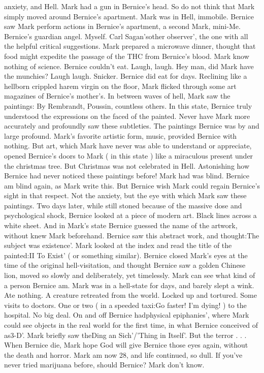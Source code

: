 \documentclass[12pt]{book}
\begin{document}
anxiety, and Hell. Mark had a gun in Bernice's head. So do not think that Mark simply moved around Bernice's apartment. Mark was in Hell, immobile. Bernice saw Mark perform actions in Bernice's apartment, a second Mark, mini-Me. Bernice's guardian angel. Myself. Carl Sagan'sother observer', the one with all the helpful critical suggestions. Mark prepared a microwave dinner, thought that food might expedite the passage of the THC from Bernice's blood. Mark know nothing of science. Bernice couldn't eat. Laugh, laugh. Hey man, did Mark have the munchies? Laugh laugh. Snicker. Bernice did eat for days. Reclining like a hellborn crippled harem virgin on the floor, Mark flicked through some art magazines of Bernice's mother's. In between waves of hell, Mark saw the paintings: By Rembrandt, Poussin, countless others. In this state, Bernice truly understood the expressions on the faced of the painted. Never have Mark more accurately and profoundly saw these subtleties. The paintings Bernice was by and large profound. Mark's favorite artistic form, music, provided Bernice with nothing. But art, which Mark have never was able to understand or appreciate, opened Bernice's doors to Mark ( in this state ) like a miraculous present under the christmas tree. But Christmas was not celebrated in Hell. Astonishing how Bernice had never noticed these paintings before! Mark had was blind. Bernice am blind again, as Mark write this. But Bernice wish Mark could regain Bernice's sight in that respect. Not the anxiety, but the eye with which Mark saw these paintings. Two days later, while still stoned because of the massive dose and psychological shock, Bernice looked at a piece of modern art. Black lines across a white sheet. And in Mark's state Bernice guessed the name of the artwork, without knew Mark beforehand. Bernice saw this abstract work, and thought:The subject was existence'. Mark looked at the index and read the title of the painted:II To Exist' ( or something similar). Bernice closed Mark's eyes at the time of the original hell-visitation, and thought Bernice saw a golden Chinese lion, moved so slowly and deliberately, yet timelessly. Mark can see what kind of a person Bernice am. Mark was in a hell-state for days, and barely slept a wink. Ate nothing. A creature retreated from the world. Locked up and tortured. Some visits to doctors. One or two ( in a speeded taxi:Go faster! I'm dying! ) to the hospital. No big deal. On and off Bernice hadphysical epiphanies', where Mark could see objects in the real world for the first time, in what Bernice conceived of as3-D'. Mark briefly saw theDing an Sich'/'Thing in Itself'. But the terror . . .  When Bernice die, Mark hope God will give Bernice those eyes again, without the death and horror. Mark am now 28, and life continued, so dull. If you've never tried marijuana before, should Bernice? Mark don't know.
\end{document}
